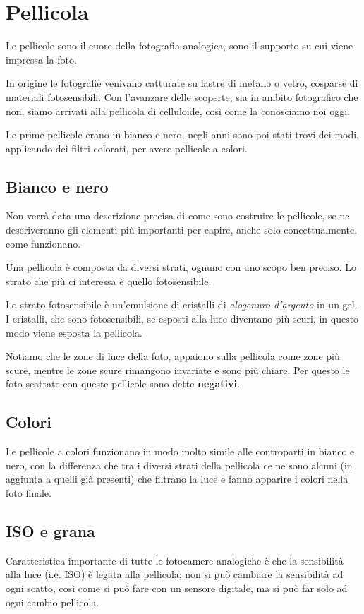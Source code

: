 \section{Pellicola} \label{sec:pellicola}
Le pellicole sono il cuore della fotografia analogica, sono il supporto su cui viene impressa la foto.

In origine le fotografie venivano catturate su lastre di metallo o vetro, cosparse di materiali fotosensibili. Con l'avanzare delle scoperte, sia in ambito fotografico che non, siamo arrivati alla pellicola di celluloide, così come la conosciamo noi oggi.

Le prime pellicole erano in bianco e nero, negli anni sono poi stati trovi dei modi, applicando dei filtri colorati, per avere pellicole a colori.

\subsection{Bianco e nero} \label{subsec:pellicolabw}
Non verrà data una descrizione precisa di come sono costruire le pellicole, se ne descriveranno gli elementi più importanti per capire, anche solo concettualmente, come funzionano.

Una pellicola è composta da diversi strati, ognuno con uno scopo ben preciso. Lo strato che più ci interessa è quello fotosensibile.

Lo strato fotosensibile è un'emulsione di cristalli di \textit{alogenuro d'argento} in un gel. I cristalli, che sono fotosensibili, se esposti alla luce diventano più scuri, in questo modo viene esposta la pellicola.

Notiamo che le zone di luce della foto, appaiono sulla pellicola come zone più scure, mentre le zone scure rimangono invariate e sono più chiare. Per questo le foto scattate con queste pellicole sono dette \textbf{negativi}.


\subsection{Colori} \label{subsec:pellicolacolori}
Le pellicole a colori funzionano in modo molto simile alle controparti in bianco e nero, con la differenza che tra i diversi strati della pellicola ce ne sono alcuni (in aggiunta a quelli già presenti) che filtrano la luce e fanno apparire i colori nella foto finale.


\subsection{ISO e grana} \label{subsec:isograna}
Caratteristica importante di tutte le fotocamere analogiche è che la sensibilità alla luce (i.e. ISO) è legata alla pellicola; non si può cambiare la sensibilità ad ogni scatto, così come si può fare con un sensore digitale, ma si può far solo ad ogni cambio pellicola.

